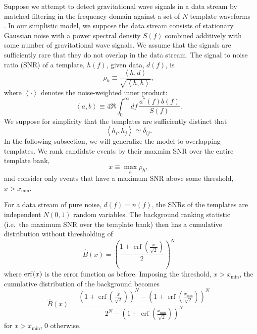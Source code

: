 \documentclass[aps,prd]{revtex4-1}
\newcommand{\xmin}{x_\mathrm{min}}
\DeclareMathOperator{\erf}{erf}
\begin{document}
Suppose we attempt to detect gravitational wave signals in a data
stream by matched filtering in the frequency domain against a set of
$N$ template waveforms \citep[e.g.,][]{findchirppaper,LVC2011}.  In
our simplistic model, we suppose the data stream consists of
stationary Gaussian noise with a power spectral density $S(f)$
combined additively with some number of gravitational wave signals.
We assume that the signals are sufficiently rare that they do not
overlap in the data stream.  The signal to noise ratio (SNR) of a
template, $h(f)$, given data, $d(f)$, is
\begin{equation}
  \rho_h \equiv \frac{\left\langle h, d \right\rangle}{\sqrt{\left
      \langle h, h \right\rangle}},
\end{equation}
where $\left \langle \cdot \right\rangle$ denotes the noise-weighted
inner product:
\begin{equation}
  \left\langle a, b \right\rangle \equiv 4 \Re \int_0^\infty df\,
  \frac{a^*(f) b(f)}{S(f)}.
\end{equation}
We suppose for simplicity that the templates are sufficiently distinct
that
\begin{equation}
  \left\langle h_i, h_j \right\rangle \simeq \delta_{ij}.
\end{equation}
In the following subsection, we will generalize the model to
overlapping templates.  We rank candidate events by their maxmim SNR
over the entire template bank,
\begin{equation}
  x \equiv \max_{h} \rho_h,
\end{equation}
and consider only events that have a maximum SNR above some threshold,
$x > \xmin$.

For a data stream of pure noise, $d(f) = n(f)$, the SNRs of the
templates are independent $N(0,1)$ random variables.  The background
ranking statistic (i.e.\ the maximum SNR over the template bank) then
has a cumulative distribution without thresholding of
\begin{equation}
  \hat{B}(x) = \left( \frac{1 + \erf\left( \frac{x}{\sqrt{2}}
    \right)}{2} \right)^N
\end{equation}
where ${\rm erf}(x)$ is the error function as before. Imposing the
threshold, $x > \xmin$, the cumulative distribution of the background
becomes
\begin{equation}
  \label{eq:analytic-background-rate}
  \hat{B}(x) = \frac{\left( 1 + \erf\left( \frac{x}{{\sqrt{2}}}
    \right) \right)^N - \left( 1 + \erf\left( \frac{\xmin}{{\sqrt{2}}}
    \right) \right)^N}{2^N - \left( 1 + \erf\left(
    \frac{\xmin}{{\sqrt{2}}} \right) \right)^N }
\end{equation}
for $x>\xmin$, $0$ otherwise.
\end{document}

